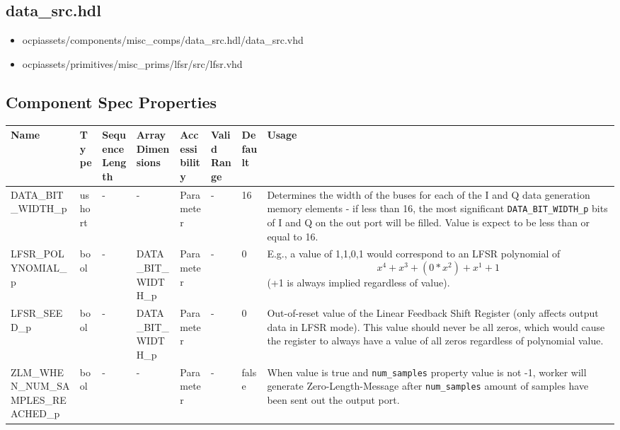 \documentclass{article}
\def\comp{data\_src}
\begin{document}
\subsection*{\comp.hdl}
\begin{itemize}
  \item ocpiassets/components/misc\_comps/data\_src.hdl/data\_src.vhd
  \item ocpiassets/primitives/misc\_prims/lfsr/src/lfsr.vhd
\end{itemize}


\begin{landscape}
	\section*{Component Spec Properties}
	\begin{scriptsize}
\begin{tabular}{|p{5.5cm}|p{1.25cm}|p{2cm}|p{2.75cm}|p{1.5cm}|p{1.5cm}|p{1cm}|p{5.25cm}|}
\hline
\rowcolor{blue}
Name                 & Type   & SequenceLength & ArrayDimensions & Accessibility       & Valid Range & Default & Usage
\\
\hline
DATA\_BIT\_WIDTH\_p & ushort  & - & - & Parameter & -  &16 & Determines the width of the buses for each of the I and Q data generation memory elements - if less than 16, the most significant \verb+DATA_BIT_WIDTH_p+ bits of I and Q on the out port will be filled. Value is expect to be less than or equal to 16.
\\
\hline
LFSR\_POLYNOMIAL\_p & bool  & - & DATA\_BIT\_WIDTH\_p & Parameter & -  &0 & E.g., a value of 1,1,0,1 would correspond to an LFSR polynomial of \begin{equation*}x^4 + x^3 + (0*x^2) + x^1 + 1\end{equation*} (+1 is always implied regardless of value).
\\
\hline
LFSR\_SEED\_p & bool  & - & DATA\_BIT\_WIDTH\_p & Parameter & -  &0 & Out-of-reset value of the Linear Feedback Shift Register (only affects output data in LFSR mode). This value should never be all zeros, which would cause the register to always have a value of all zeros regardless of polynomial value.
\\
\hline
ZLM\_WHEN\_NUM\_SAMPLES\_REACHED\_p & bool  & - & - & Parameter & -  &false & When value is true and \verb+num_samples+ property value is not -1, worker will generate Zero-Length-Message after \verb+num_samples+ amount of samples have been sent out the output port.

\end{tabular}
\end{scriptsize}
\end{landscape}
\end{document}
